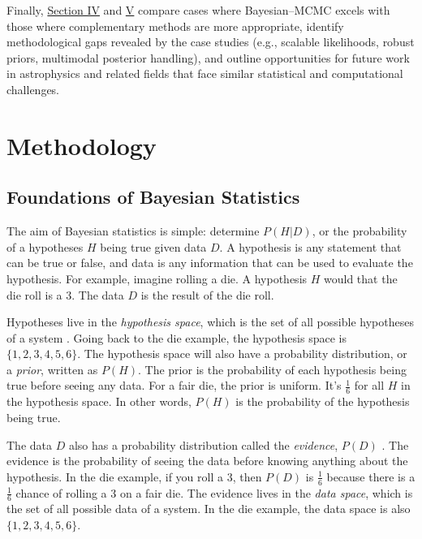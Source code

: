 \documentclass[preprint,longauthor]{aastex631}
\begin{document}
Finally, \hyperref[placeholder]{Section IV} and \hyperref[placeholder]{V} compare cases where Bayesian–MCMC excels with those where complementary methods are more appropriate, identify methodological gaps revealed by the case studies (e.g., scalable likelihoods, robust priors, multimodal posterior handling), and outline opportunities for future work in astrophysics and related fields that face similar statistical and computational challenges.

\section{Methodology}
\label{sec:Methodology}

\subsection{Foundations of Bayesian Statistics} %
The aim of Bayesian statistics is simple: determine $P(H|D)$, or the probability of a hypotheses $H$ being true given data $D$. A hypothesis is any statement that can be true or false, and data is any information that can be used to evaluate the hypothesis. For example, imagine rolling a die. A hypothesis $H$ would that the die roll is a 3. The data $D$ is the result of the die roll.

Hypotheses live in the \textit{hypothesis space}, which is the set of all possible hypotheses of a system \citep{brewer1BayesianInference2018}. Going back to the die example, the hypothesis space is $\{1,2,3,4,5,6\}$. The hypothesis space will also have a probability distribution, or a \textit{prior}, written as $P(H)$. The prior is the probability of each hypothesis being true before seeing any data. For a fair die, the prior is uniform. It's $\frac{1}{6}$ for all $H$ in the hypothesis space. In other words, $P(H)$ is the probability of the hypothesis being true.

The data $D$ also has a probability distribution called the \textit{evidence}, $P(D)$ \citep{brewer1BayesianInference2018}. The evidence is the probability of seeing the data before knowing anything about the hypothesis. In the die example, if you roll a 3, then $P(D)$ is $\frac{1}{6}$ because there is a $\frac{1}{6}$ chance of rolling a 3 on a fair die. The evidence lives in the \textit{data space}, which is the set of all possible data of a system. In the die example, the data space is also $\{1,2,3,4,5,6\}$.
\end{document}
